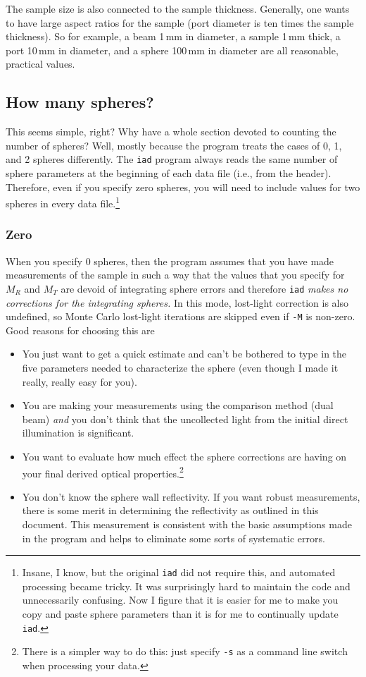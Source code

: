 \documentclass{article}
\newcommand\iadprog{\texttt{iad}}
\begin{document}
The sample size is also connected to the sample thickness.  Generally, one
wants to have large aspect ratios for the sample (port diameter is ten times
the sample thickness).  So for example, a beam 1\,mm in diameter,
a sample 1\,mm thick, a port 10\,mm in diameter, and a sphere 100\,mm in diameter 
are all reasonable, practical values.

\subsection{How many spheres?}

This seems simple, right?  Why have a whole section devoted to counting the number
of spheres?  Well, mostly because the program treats the cases of 0, 1, and 2
spheres differently.  The \iadprog{} program always reads the same number of sphere parameters at the beginning of each data file (i.e., from the header).  Therefore, even
if you specify zero spheres, you will need to include values for two spheres 
in every data file.\footnote{Insane, I know, but the original \iadprog{} did not require this,
and automated processing became tricky.  It was surprisingly
hard to maintain the code and unnecessarily confusing.  Now I figure that it is easier
for me to make you copy and paste sphere parameters than it is for me to continually update
\iadprog{}.}

\subsubsection{Zero}

When you specify 0 spheres, then the program assumes that 
you have made measurements of the sample in such a way that the values that you
specify for $M_R$ and $M_T$ are devoid of integrating sphere errors and therefore
\iadprog{} \textit{ makes no corrections for the integrating spheres.}  In this
mode, lost-light correction is also undefined, so Monte Carlo lost-light
iterations are skipped even if \texttt{-M} is non-zero.  Good
reasons for choosing this are
\begin{itemize}
\item
You just want to get a quick estimate and can't be bothered to type in the
five parameters needed to characterize the sphere (even though I made it really,
really easy for you).
\item
You are making your measurements using the comparison method (dual beam) \textit{and}
you don't think that the uncollected light from the initial direct illumination
is significant.
\item
You want to evaluate how much effect the sphere corrections are having on
your final derived optical properties.\footnote{There is a simpler
way to do this: just specify \texttt{-s} as a command line switch when processing
your data.}
\item
You don't know the sphere wall reflectivity.  If you want robust measurements,
there is some merit in determining the reflectivity as outlined in this document.
This measurement is consistent with the basic assumptions made in the program and
helps to eliminate some sorts of systematic errors.
\end{itemize}
\end{document}
